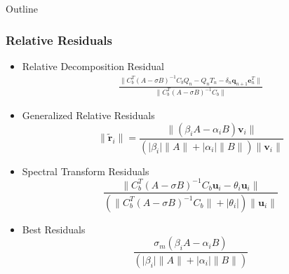 \documentclass[landscape]{beamer}
\begin{document}
\begin{frame}[allowframebreaks]{Outline}
  \frametitle{Relative Residuals}
  
  \begin{itemize}
  \item Relative Decomposition Residual
    \begin{align*}
    	\frac{\|C_b^T (A-\sigma B)^{-1} C_bQ_n - Q_nT_n - \delta_{n}\mathbf{q}_{n+1}\mathbf{e}_n^T\|}{\|C_b^T (A-\sigma B)^{-1} C_b\|}
    \end{align*}
  \item Generalized Relative Residuals
    \begin{equation*}
    	\|\tilde{\mathbf{r}}_i\| = \frac{\| (\beta_i A - \alpha_i B)\mathbf{v}_i \| }{(\lvert \beta_i \rvert \|A\| + \lvert \alpha_i \rvert \|B\|)\|\mathbf{v}_i\| }
    \end{equation*}
   \item Spectral Transform Residuals
   \begin{equation*}
	 \frac{\| C_b^T(A - \sigma B)^{-1}C_b \mathbf{u}_i - \theta_i \mathbf{u}_i \| }{( \| C_b^T(A - \sigma B)^{-1}C_b \| + \lvert \theta_i \rvert)\|\mathbf{u}_i\| }
   \end{equation*}
   
   \item Best Residuals
   \begin{equation*}
   	\frac{\sigma_m(\beta_i A - \alpha_i B)}{(\lvert \beta_i \rvert \|A\| + \lvert \alpha_i \rvert \|B\|)}
   \end{equation*}
   
  \end{itemize}
\end{frame}
\end{document}
